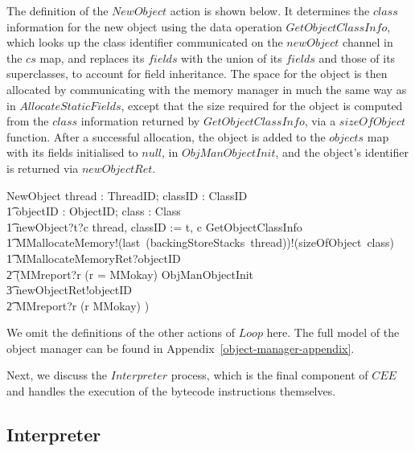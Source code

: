 The definition of the $NewObject$ action is shown below.
It determines the $class$ information for the new object using the
data operation $GetObjectClassInfo$, which looks up the class
identifier communicated on the $newObject$ channel in the $cs$ map, and
replaces its $fields$ with the union of its $fields$ and those of its
superclasses, to account for field inheritance.
The space for the object is then allocated by communicating with the
memory manager in much the same way as in $AllocateStaticFields$,
except that the size required for the object is computed from the
$class$ information returned by $GetObjectClassInfo$, via a
$sizeOfObject$ function.
After a successful allocation, the object is added to the $objects$
map with its fields initialised to $null$, in $ObjManObjectInit$, and
the object's identifier is returned via $newObjectRet$.
\begin{circusaction}
  NewObject \circdef \circvar thread : ThreadID; classID : ClassID \circspot \\
  \t1 \circvar objectID : ObjectID; class : Class \circspot \\
  \t1 newObject?t?c \then thread, classID := t, c \circseq \lschexpract GetObjectClassInfo \rschexpract \circseq \\
  \t1 MMallocateMemory!(last~(backingStoreStacks~thread))!(sizeOfObject~class) \then {} \\
  \t1 MMallocateMemoryRet?objectID \then {} \\
  \t2 (MMreport?r \prefixcolon (r = MMokay) \then \lschexpract ObjManObjectInit \rschexpract \circseq \\
  \t3 newObjectRet!objectID \then \Skip \\
  \t2 {} \extchoice MMreport?r \prefixcolon (r \neq MMokay) \then \Chaos) 
\end{circusaction}

We omit the definitions of the other actions of $Loop$ here. 
The full model of the object manager can be found in
Appendix~\ref{object-manager-appendix}.

Next, we discuss the $Interpreter$ process, which is the final
component of $CEE$ and handles the execution of the bytecode
instructions themselves.

\subsection{Interpreter}
\label{cee-interpreter-subsection}

